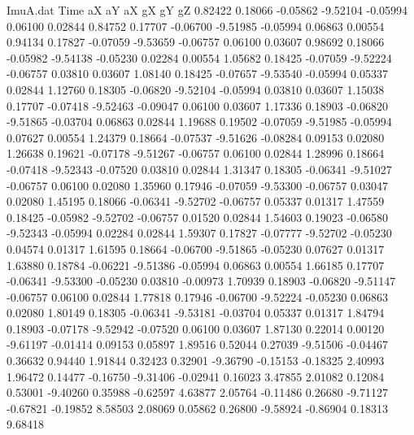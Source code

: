\begin{filecontents}{ImuA.dat}
Time aX aY aX gX gY gZ
   0.82422    0.18066   -0.05862   -9.52104   -0.05994    0.06100    0.02844
   0.84752    0.17707   -0.06700   -9.51985   -0.05994    0.06863    0.00554
   0.94134    0.17827   -0.07059   -9.53659   -0.06757    0.06100    0.03607
   0.98692    0.18066   -0.05982   -9.54138   -0.05230    0.02284    0.00554
   1.05682    0.18425   -0.07059   -9.52224   -0.06757    0.03810    0.03607
   1.08140    0.18425   -0.07657   -9.53540   -0.05994    0.05337    0.02844
   1.12760    0.18305   -0.06820   -9.52104   -0.05994    0.03810    0.03607
   1.15038    0.17707   -0.07418   -9.52463   -0.09047    0.06100    0.03607
   1.17336    0.18903   -0.06820   -9.51865   -0.03704    0.06863    0.02844
   1.19688    0.19502   -0.07059   -9.51985   -0.05994    0.07627    0.00554
   1.24379    0.18664   -0.07537   -9.51626   -0.08284    0.09153    0.02080
   1.26638    0.19621   -0.07178   -9.51267   -0.06757    0.06100    0.02844
   1.28996    0.18664   -0.07418   -9.52343   -0.07520    0.03810    0.02844
   1.31347    0.18305   -0.06341   -9.51027   -0.06757    0.06100    0.02080
   1.35960    0.17946   -0.07059   -9.53300   -0.06757    0.03047    0.02080
   1.45195    0.18066   -0.06341   -9.52702   -0.06757    0.05337    0.01317
   1.47559    0.18425   -0.05982   -9.52702   -0.06757    0.01520    0.02844
   1.54603    0.19023   -0.06580   -9.52343   -0.05994    0.02284    0.02844
   1.59307    0.17827   -0.07777   -9.52702   -0.05230    0.04574    0.01317
   1.61595    0.18664   -0.06700   -9.51865   -0.05230    0.07627    0.01317
   1.63880    0.18784   -0.06221   -9.51386   -0.05994    0.06863    0.00554
   1.66185    0.17707   -0.06341   -9.53300   -0.05230    0.03810   -0.00973
   1.70939    0.18903   -0.06820   -9.51147   -0.06757    0.06100    0.02844
   1.77818    0.17946   -0.06700   -9.52224   -0.05230    0.06863    0.02080
   1.80149    0.18305   -0.06341   -9.53181   -0.03704    0.05337    0.01317
   1.84794    0.18903   -0.07178   -9.52942   -0.07520    0.06100    0.03607
   1.87130    0.22014    0.00120   -9.61197   -0.01414    0.09153    0.05897
   1.89516    0.52044    0.27039   -9.51506   -0.04467    0.36632    0.94440
   1.91844    0.32423    0.32901   -9.36790   -0.15153   -0.18325    2.40993
   1.96472    0.14477   -0.16750   -9.31406   -0.02941    0.16023    3.47855
   2.01082    0.12084    0.53001   -9.40260    0.35988   -0.62597    4.63877
   2.05764   -0.11486    0.26680   -9.71127   -0.67821   -0.19852    8.58503
   2.08069    0.05862    0.26800   -9.58924   -0.86904    0.18313    9.68418

\end{filecontents}
